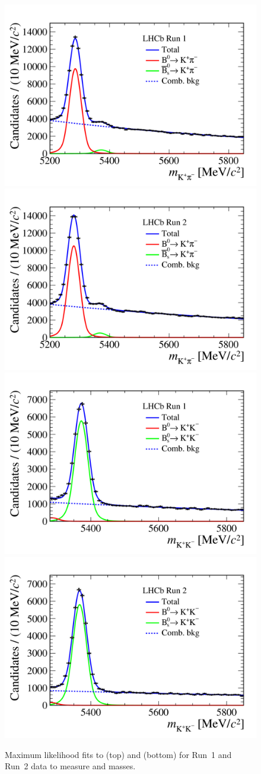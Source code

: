 \begin{figure}[tbp]
    \centering
     \includegraphics[width= 0.49 \textwidth]{./Figs/BFAnalysis/hidef_Fig9top.png}
     \includegraphics[width= 0.49 \textwidth]{./Figs/BFAnalysis/hidef_Fig9bot.png}
     \includegraphics[width= 0.49 \textwidth]{./Figs/BFAnalysis/hidef_Fig10top.png}
     \includegraphics[width= 0.49 \textwidth]{./Figs/BFAnalysis/hidef_Fig10bot.png}
     \caption{Maximum likelihood fits to \bdkpi (top) and \bskk (bottom) for Run~1 and Run~2 data to measure \bd and \bs masses.}
     \label{fig:means}
\end{figure}

